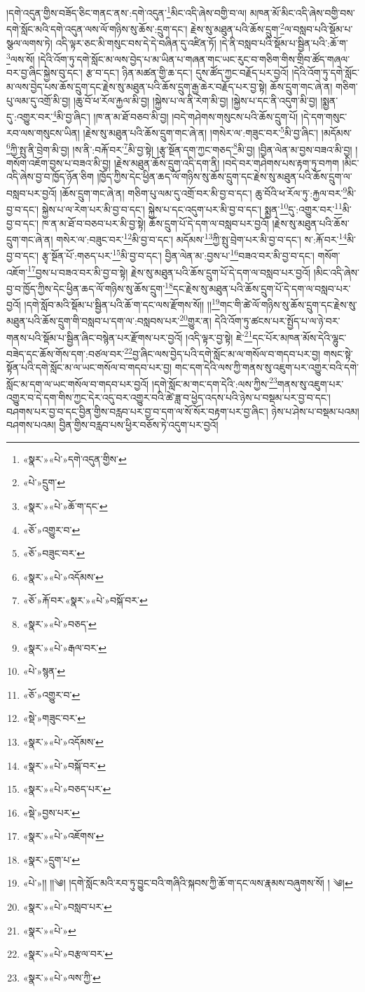 །དགེ་འདུན་གྱིས་བཟོད་ཅིང་གནང་ནས་:དགེ་འདུན་\footnote{«སྣར་»«པེ་»དགེ་འདུན་གྱིས་}མིང་འདི་ཞེས་བགྱི་བ་ལ། མཁན་མོ་མིང་འདི་ཞེས་བགྱི་བས་དགེ་སློང་མའི་དགེ་འདུན་ལས་ལོ་གཉིས་སུ་ཆོས་:དྲུག་དང་། རྗེས་སུ་མཐུན་པའི་ཆོས་དྲུག་\footnote{«པེ་»དྲུག་}ལ་བསླབ་པའི་སྡོམ་པ་སྩལ་ལགས་ཏེ། འདི་ལྟར་ཅང་མི་གསུང་བས་དེ་དེ་བཞིན་དུ་འཛིན་ཏོ། །དེ་ནི་བསླབ་པའི་སྡོམ་པ་སྦྱིན་པའི་:ཆོ་ག་\footnote{«སྣར་»«པེ་»ཆོ་ག་དང་}ལས་སོ། །དེའི་འོག་ཏུ་དགེ་སློང་མ་ལས་བྱེད་པ་མ་ཡིན་པ་གཞན་གང་ཡང་རུང་བ་གཅིག་གིས་གྲིབ་ཚོད་གཞལ་བར་བྱ་ཞིང་སྐྱེས་བུ་དང་། རྩ་བ་དང་། ཉིན་མཚན་གྱི་ཆ་དང་། དུས་ཚོད་ཀྱང་བརྗོད་པར་བྱའོ། །དེའི་འོག་ཏུ་དགེ་སློང་མ་ལས་བྱེད་པས་ཆོས་དྲུག་དང་རྗེས་སུ་མཐུན་པའི་ཆོས་དྲུག་རྒྱ་ཆེར་བརྗོད་པར་བྱ་སྟེ། ཆོས་དྲུག་གང་ཞེ་ན། གཅིག་པུ་ལམ་དུ་འགྲོ་མི་བྱ། །ཆུ་བོ་ཕ་རོལ་རྐྱལ་མི་བྱ། །སྐྱེས་པ་ལ་ནི་རེག་མི་བྱ། །སྐྱེས་པ་དང་ནི་འདུག་མི་བྱ། །སྨྱན་དུ་:འགྱུར་བར་\footnote{«ཅོ་»འགྱུར་བ་}མི་བྱ་ཞིང་། །ཁ་ན་མ་ཐོ་བཅབ་མི་བྱ། །བདེ་གཤེགས་གསུངས་པའི་ཆོས་དྲུག་པོ། །དེ་དག་གསུང་རབ་ལས་གསུངས་ཡིན། །རྗེས་སུ་མཐུན་པའི་ཆོས་དྲུག་གང་ཞེ་ན། །གསེར་ལ་:གཟུང་བར་\footnote{«ཅོ་»བཟུང་བར་}མི་བྱ་ཞིང་། །མདོམས་\footnote{«སྣར་»«པེ་»འདོམས་}ཀྱི་སྤུ་ནི་བྲེག་མི་བྱ། །ས་ནི་:བརྐོ་བར་\footnote{«ཅོ་»རྐོ་བར་«སྣར་»«པེ་»བསྐོ་བར་}མི་བྱ་སྟེ། །རྩྭ་སྔོན་དག་ཀྱང་གཅད་\footnote{«སྣར་»«པེ་»བཅད་}མི་བྱ། །བྱིན་ལེན་མ་བྱས་བཟའ་མི་བྱ། །གསོག་འཇོག་བྱས་པ་བཟའ་མི་བྱ། །རྗེས་མཐུན་ཆོས་དྲུག་འདི་དག་ནི། །བདེ་བར་གཤེགས་པས་རྟག་ཏུ་བཀག །མིང་འདི་ཞེས་བྱ་བ་ཁྱོད་ཉོན་ཅིག །ཁྱོད་ཀྱིས་དེང་ཕྱིན་ཆད་ལོ་གཉིས་སུ་ཆོས་དྲུག་དང་རྗེས་སུ་མཐུན་པའི་ཆོས་དྲུག་ལ་བསླབ་པར་བྱའོ། །ཆོས་དྲུག་གང་ཞེ་ན། གཅིག་པུ་ལམ་དུ་འགྲོ་བར་མི་བྱ་བ་དང་། ཆུ་བོའི་ཕ་རོལ་ཏུ་:རྐྱལ་བར་\footnote{«སྣར་»«པེ་»རྒལ་བར་}མི་བྱ་བ་དང་། སྐྱེས་པ་ལ་རེག་པར་མི་བྱ་བ་དང་། སྐྱེས་པ་དང་འདུག་པར་མི་བྱ་བ་དང་། སྨྱན་\footnote{«པེ་»སྙན་}དུ་:འགྱུར་བར་\footnote{«ཅོ་»འགྱུར་བ་}མི་བྱ་བ་དང་། ཁ་ན་མ་ཐོ་བ་བཅབ་པར་མི་བྱ་སྟེ། ཆོས་དྲུག་པོ་དེ་དག་ལ་བསླབ་པར་བྱའོ། །རྗེས་སུ་མཐུན་པའི་ཆོས་དྲུག་གང་ཞེ་ན། གསེར་ལ་:བཟུང་བར་\footnote{«སྡེ་»གཟུང་བར་}མི་བྱ་བ་དང་། མདོམས་\footnote{«སྣར་»«པེ་»འདོམས་}ཀྱི་སྤུ་བྲེག་པར་མི་བྱ་བ་དང་། ས་:རྐོ་བར་\footnote{«སྣར་»«པེ་»བསྐོ་བར་}མི་བྱ་བ་དང་། རྩྭ་སྔོན་པོ་:གཅད་པར་\footnote{«སྣར་»«པེ་»བཅད་པར་}མི་བྱ་བ་དང་། བྱིན་ལེན་མ་:བྱས་པ་\footnote{«སྡེ་»བྱས་པར་}བཟའ་བར་མི་བྱ་བ་དང་། གསོག་འཇོག་\footnote{«སྣར་»«པེ་»འཇོགས་}བྱས་པ་བཟའ་བར་མི་བྱ་བ་སྟེ། རྗེས་སུ་མཐུན་པའི་ཆོས་དྲུག་པོ་དེ་དག་ལ་བསླབ་པར་བྱའོ། །མིང་འདི་ཞེས་བྱ་བ་ཁྱོད་ཀྱིས་དེང་ཕྱིན་ཆད་ལོ་གཉིས་སུ་ཆོས་དྲུག་\footnote{«སྣར་»དྲུག་པ་}དང་རྗེས་སུ་མཐུན་པའི་ཆོས་དྲུག་པོ་དེ་དག་ལ་བསླབ་པར་བྱའོ། །དགེ་སློབ་མའི་སྡོམ་པ་སྦྱིན་པའི་ཆོ་ག་དང་ལས་རྫོགས་སོ།། །།\footnote{«པེ་»།། །།༄། །དགེ་སློང་མའི་རབ་ཏུ་བྱུང་བའི་གཞིའི་སྐབས་ཀྱི་ཆོ་ག་དང་ལས་རྣམས་བཞུགས་སོ། ། ༄། }གང་གི་ཚེ་ལོ་གཉིས་སུ་ཆོས་དྲུག་དང་རྗེས་སུ་མཐུན་པའི་ཆོས་དྲུག་གི་བསླབ་པ་དག་ལ་:བསླབས་པར་\footnote{«སྣར་»«པེ་»བསླབ་པར་}གྱུར་ན། དེའི་འོག་ཏུ་ཚངས་པར་སྤྱོད་པ་ལ་ཉེ་བར་གནས་པའི་སྡོམ་པ་སྦྱིན་ཞིང་བསྙེན་པར་རྫོགས་པར་བྱའོ། །འདི་ལྟར་བྱ་སྟེ། ཇེ་\footnote{«སྣར་»«པེ་»}དང་པོར་མཁན་མོས་དེའི་ལྷུང་བཟེད་དང་ཆོས་གོས་དག་:བཙལ་བར་\footnote{«སྣར་»«པེ་»བརྩལ་བར་}བྱ་ཞིང་ལས་བྱེད་པའི་དགེ་སློང་མ་ལ་གསོལ་བ་གདབ་པར་བྱ། གསང་སྟེ་སྟོན་པའི་དགེ་སློང་མ་ལ་ཡང་གསོལ་བ་གདབ་པར་བྱ། གང་དག་དེའི་ལས་ཀྱི་གནས་སུ་འཇུག་པར་འགྱུར་བའི་དགེ་སློང་མ་དག་ལ་ཡང་གསོལ་བ་གདབ་པར་བྱའོ། །དགེ་སློང་མ་གང་དག་དེའི་:ལས་ཀྱིས་\footnote{«སྣར་»«པེ་»ལས་ཀྱི་}གནས་སུ་འཇུག་པར་འགྱུར་བ་དེ་དག་གིས་ཀྱང་དེར་འདུ་བར་འགྱུར་བའི་ཚེ་ཟླ་བ་ཕྱེད་འདས་པའི་ཉེས་པ་བསྡམ་པར་བྱ་བ་དང་། བཤགས་པར་བྱ་བ་དང་བྱིན་གྱིས་བརླབ་པར་བྱ་བ་དག་ལ་སོ་སོར་བརྟག་པར་བྱ་ཞིང་། ཉེས་པ་ཤེས་པ་བསྡམ་པའམ། བཤགས་པའམ། བྱིན་གྱིས་བརླབ་པས་ཕྱིར་བཅོས་ཏེ་འདུག་པར་བྱའོ། 